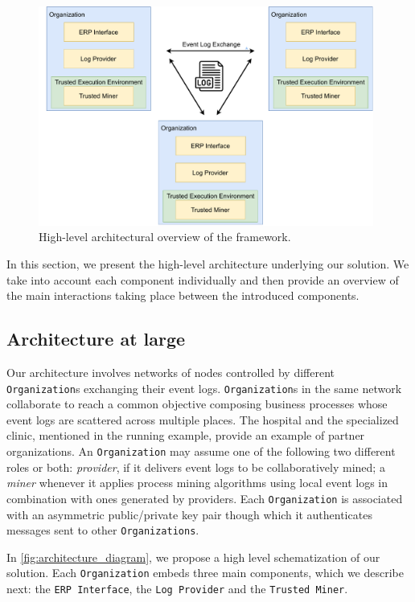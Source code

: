\begin{figure}[t]
\centering
\includegraphics[width=11cm]{content/figures/architecture_diagram.pdf}
\caption{High-level architectural overview of the framework.}
\label{fig:implementation}
\end{figure}
In this section, we present the high-level architecture underlying our solution. We take into account each component individually and then provide an overview of the main interactions taking place between the introduced components.

\subsection{Architecture at large}
Our architecture involves networks of nodes controlled by different \texttt{Organization}s exchanging their event logs. \texttt{Organization}s in the same network collaborate to reach a common objective composing business processes whose event logs are scattered across multiple places. The hospital and the specialized clinic,
mentioned in the running example, provide an example of partner organizations. An \texttt{Organization} may assume one of the following two different roles or both: %
\textit{provider}, if it delivers event logs to be collaboratively mined;
a \textit{miner} whenever it applies process mining algorithms using local event logs in combination with ones generated by providers.
Each \texttt{Organization} is associated with an asymmetric public/private key pair %
though which it authenticates messages sent to other \texttt{Organizations}.

In \cref{fig:architecture_diagram}, we propose a high level schematization of our solution. Each \texttt{Organization} embeds three main components, which we describe next: the \texttt{ERP Interface}, the \texttt{Log Provider} and the \texttt{Trusted Miner}. %

